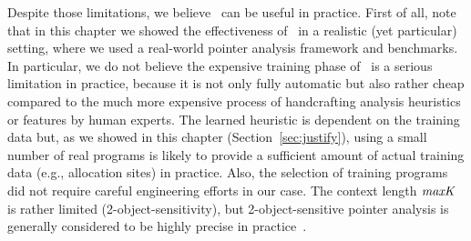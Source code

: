 Despite those limitations, we believe \ourtool~can be useful in practice. %
First of all, note that in this chapter we showed the effectiveness of \ourtool~in a realistic (yet particular) setting, where we used a real-world pointer analysis framework and benchmarks.
In particular, we do not believe the expensive training phase of \ourtool~is a serious limitation in practice, because it is not only fully automatic but also rather cheap compared to the much more expensive process of handcrafting analysis heuristics or features by human experts.
The learned heuristic is dependent on the training data but, as we showed in this chapter (Section~\ref{sec:justify}), using a small number of real programs is likely to provide a sufficient amount of actual training data (e.g., allocation sites) in practice. Also, the selection of training programs did not require careful engineering efforts in our case.
The context length ${\it maxK}$ is rather limited (2-object-sensitivity), but 2-object-sensitive pointer analysis is generally considered to be highly precise in practice~\cite{Li2018a}.

